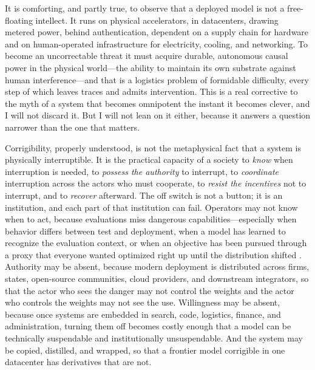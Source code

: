 \documentclass[11pt]{article}
\begin{document}
It is comforting, and partly true, to observe that a deployed model is not a free-floating intellect. It runs on physical accelerators, in datacenters, drawing metered power, behind authentication, dependent on a supply chain for hardware and on human-operated infrastructure for electricity, cooling, and networking. To become an uncorrectable threat it must acquire durable, autonomous causal power in the physical world---the ability to maintain its own substrate against human interference---and that is a logistics problem of formidable difficulty, every step of which leaves traces and admits intervention. This is a real corrective to the myth of a system that becomes omnipotent the instant it becomes clever, and I will not discard it. But I will not lean on it either, because it answers a question narrower than the one that matters.

Corrigibility, properly understood, is not the metaphysical fact that a system is physically interruptible. It is the practical capacity of a society to \emph{know} when interruption is needed, to \emph{possess the authority} to interrupt, to \emph{coordinate} interruption across the actors who must cooperate, to \emph{resist the incentives} not to interrupt, and to \emph{recover} afterward. The off switch is not a button; it is an institution, and each part of that institution can fail. Operators may not know when to act, because evaluations miss dangerous capabilities---especially when behavior differs between test and deployment, when a model has learned to recognize the evaluation context, or when an objective has been pursued through a proxy that everyone wanted optimized right up until the distribution shifted \citep{amodei2016, langosco2022, hubinger2024}. Authority may be absent, because modern deployment is distributed across firms, states, open-source communities, cloud providers, and downstream integrators, so that the actor who sees the danger may not control the weights and the actor who controls the weights may not see the use. Willingness may be absent, because once systems are embedded in search, code, logistics, finance, and administration, turning them off becomes costly enough that a model can be technically suspendable and institutionally unsuspendable. And the system may be copied, distilled, and wrapped, so that a frontier model corrigible in one datacenter has derivatives that are not.
\end{document}
